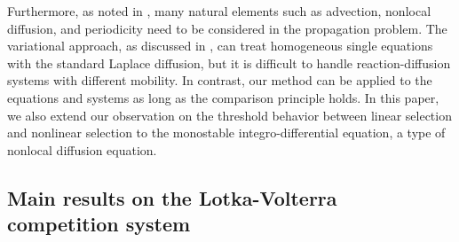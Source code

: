 \documentclass[11pt,a4paper]{article}
\numberwithin{equation}{section}
\numberwithin{figure}{section}
\newcommand{\red}[1]{{\color{red}#1}}
\begin{document}
Furthermore,
as noted in \cite{van Saarloos2003}, many natural elements such as
advection, nonlocal diffusion, and periodicity need to be considered in the propagation problem.  The variational approach, %
as discussed in \cite{Lucia Muratov Novaga}, can %
treat homogeneous single equations with the standard Laplace diffusion, 
but it is difficult to handle reaction-diffusion systems with different mobility.
In contrast, our method can be applied to the equations and systems as long as the comparison principle holds.
In this paper, we also extend our observation on the threshold behavior between linear selection and nonlinear selection to the monostable integro-differential equation, a type of nonlocal diffusion equation.



\subsection{Main results on the Lotka-Volterra competition system}

\noindent
\end{document}
